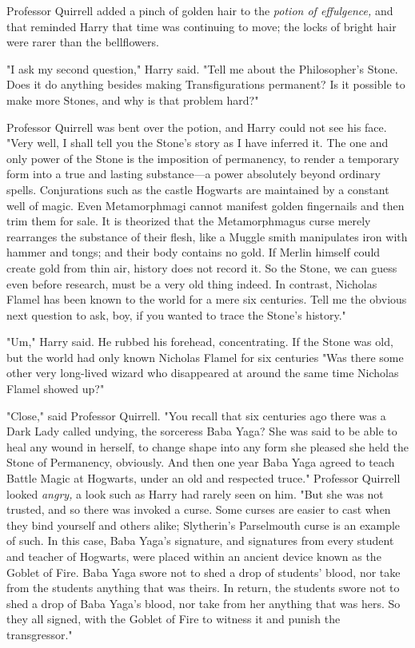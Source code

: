 Professor Quirrell added a pinch of golden hair to the \emph{potion of
effulgence,} and that reminded Harry that time was continuing to move; the
locks of bright hair were rarer than the bellflowers.

"I ask my second question," Harry said. "Tell me about the Philosopher's Stone.
Does it do anything besides making Transfigurations permanent? Is it possible
to make more Stones, and why is that problem hard?"

Professor Quirrell was bent over the potion, and Harry could not see his face.
"Very well, I shall tell you the Stone's story as I have inferred it. The one
and only power of the Stone is the imposition of permanency, to render a
temporary form into a true and lasting substance---a power absolutely beyond
ordinary spells. Conjurations such as the castle Hogwarts are maintained by a
constant well of magic. Even Metamorphmagi cannot manifest golden fingernails
and then trim them for sale. It is theorized that the Metamorphmagus curse
merely rearranges the substance of their flesh, like a Muggle smith manipulates
iron with hammer and tongs; and their body contains no gold. If Merlin himself
could create gold from thin air, history does not record it. So the Stone, we
can guess even before research, must be a very old thing indeed. In contrast,
Nicholas Flamel has been known to the world for a mere six centuries. Tell me
the obvious next question to ask, boy, if you wanted to trace the Stone's
history."

"Um," Harry said. He rubbed his forehead, concentrating. If the Stone was old,
but the world had only known Nicholas Flamel for six centuries{\el} "Was
there some other very long-lived wizard who disappeared at around the same time
Nicholas Flamel showed up?"

"Close," said Professor Quirrell. "You recall that six centuries ago there was
a Dark Lady called undying, the sorceress Baba Yaga? She was said to be able to
heal any wound in herself, to change shape into any form she pleased{\el}
she held the Stone of Permanency, obviously. And then one year Baba Yaga agreed
to teach Battle Magic at Hogwarts, under an old and respected truce." Professor
Quirrell looked{\el} \emph{angry,} a look such as Harry had rarely seen on
him. "But she was not trusted, and so there was invoked a curse. Some curses
are easier to cast when they bind yourself and others alike; Slytherin's
Parselmouth curse is an example of such. In this case, Baba Yaga's signature,
and signatures from every student and teacher of Hogwarts, were placed within
an ancient device known as the Goblet of Fire. Baba Yaga swore not to shed a
drop of students' blood, nor take from the students anything that was theirs.
In return, the students swore not to shed a drop of Baba Yaga's blood, nor take
from her anything that was hers. So they all signed, with the Goblet of Fire to
witness it and punish the transgressor."

